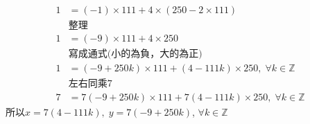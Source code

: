 \documentclass{beamer}
\begin{document}
{\begin{CJK*}{UTF8}{bkai}
\begin{frame}
\end{frame}
\begin{frame}
\begin{align*}
	1 &= (-1)\times111+4\times (250-2\times 111)\\
	  &\text{整理}\\
	1 &= (-9)\times111+4\times 250\\
	  &\text{寫成通式(小的為負，大的為正)}\\	
	1 &= (-9+250k)\times111+(4-111k)\times 250,\;\forall k\in\mathbb{Z}\\
	  &\text{左右同乘}7\\
	7 &= 7(-9+250k)\times111+7(4-111k)\times 250,\;\forall k\in\mathbb{Z}
\end{align*}
所以$x=7(4-111k),\; y=7(-9+250k)$, $\forall k\in\mathbb{Z}$
	
\end{frame}





\end{CJK*}
}
\end{document}
